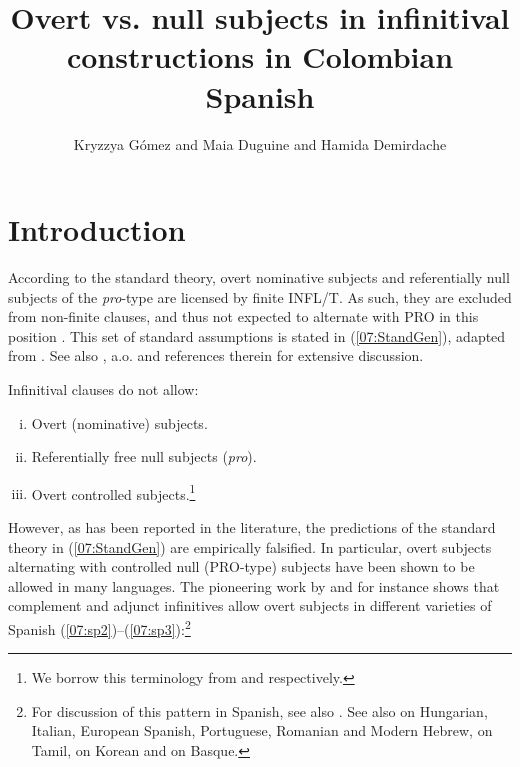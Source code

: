 \documentclass[output=paper,colorlinks,citecolor=brown,draft,draftmode]{langscibook}
\author{Kryzzya Gómez\orcid{}\affiliation{LLING-Université de Nantes /CNRS} and Maia Duguine\orcid{}\affiliation{IKER-CNRS} and  Hamida Demirdache\orcid{}\affiliation{LLING-Université de Nantes /CNRS}}
\title{Overt vs. null subjects in infinitival constructions in Colombian Spanish}
\begin{document}
\maketitle

\section{Introduction}
According to the standard theory, overt nominative subjects and referentially null subjects of the \textit{pro}-type are licensed by finite INFL/T.
As such, they are excluded from non-finite clauses, and thus not expected to alternate with PRO in this position \citep{williams80, chomsky81, rizzi86, lasnik&uriagereka88, miller02}.
This set of standard assumptions is stated in (\ref{07:StandGen}), adapted from \citet{szabolcsi09}. See also \citet{rigau95, mensching00, barbosa19, livitz11, corbalan18}, a.o. and references therein for extensive discussion.

\ea \label{07:StandGen} Infinitival clauses do not allow:
\begin{enumerate}[(i)]
 \item \label{07:StandGen1} Overt (nominative) subjects.
 \item \label{07:StandGen2} Referentially free null subjects (\textit{pro}).
 \item \label{07:StandGen3} Overt controlled subjects.\footnote{We borrow this terminology from \citet{szabolcsi09} and \citet{livitz11} respectively.}
 \end{enumerate}
\z

However, as has been reported in the literature, the predictions of the standard theory in (\ref{07:StandGen}) are empirically falsified. In particular, overt subjects alternating with controlled null (PRO-type) subjects have been shown to be allowed in many languages. The pioneering work by \citet{piera87} and \citet{lipski94} for instance shows that complement and adjunct infinitives allow overt subjects in different varieties of Spanish (\ref{07:sp2})--(\ref{07:sp3}):\footnote{For discussion of this pattern in Spanish, see also \citet{rigau95, torrego98nominative, mensching00, zagona02, pereztattam07, schulte07, herbeck11, corbalan18, gonzalez20}. See also \citet{szabolcsi09} on Hungarian, Italian, European Spanish, Portuguese, Romanian and Modern Hebrew, \citet{sundaresan&mcfadden09} on Tamil, \citet{borer89} on Korean and \citet{duguine13} on Basque.}


\end{document}
